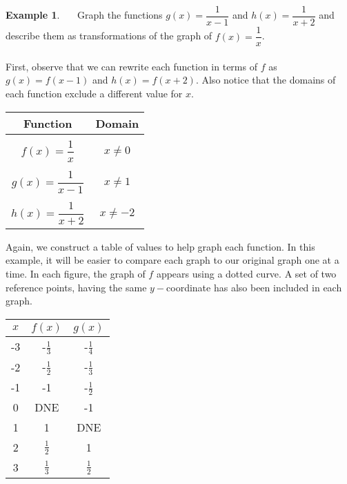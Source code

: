 \documentclass[11pt]{book}
\theoremstyle{definition}  %
\newtheorem{example}{Example}[chapter]
\begin{document}
\begin{example}~~~Graph the functions $g(x)=\dfrac{1}{x-1}$ and $h(x)=\dfrac{1}{x+2}$ and describe them as transformations of the graph of $f(x)=\dfrac{1}{x}$.\\
~\\
First, observe that we can rewrite each function in terms of $f$ as $g(x)=f(x-1)$ and $h(x)=f(x+2)$.  Also notice that the domains of each function exclude a different value for $x$.
\begin{center}
\begin{tabular}{cc}
Function & Domain\\
\hline
&\\
$f(x)=\dfrac{1}{x}$ & $x\neq 0$\\
&\\
$g(x)=\dfrac{1}{x-1}$ & $x\neq 1$\\
&\\
$h(x)=\dfrac{1}{x+2}$ & $x\neq -2$
\end{tabular}
\end{center}

Again, we construct a table of values to help graph each function.  In this example, it will be easier to compare each graph to our original graph one at a time.  In each figure, the graph of $f$ appears using a dotted curve.  A set of two reference points, having the same $y-$coordinate has also been included in each graph.

\begin{multicols}{2}
\begin{center}
\begin{tabular}{c||c|c}
$x$ & $f(x)$ & $g(x)$  \\
\hline
-3 & -$\frac{1}{3}$ & -$\frac{1}{4}$  \\
-2 & -$\frac{1}{2}$ & -$\frac{1}{3}$  \\
-1 & -1 & -$\frac{1}{2}$  \\
0 & DNE & -1  \\
1 & 1 & DNE  \\
2 & $\frac{1}{2}$ & 1  \\
3 & $\frac{1}{3}$ & $\frac{1}{2}$  \\
\end{tabular}
\end{center}


\end{multicols}
\end{example}
\end{document}
